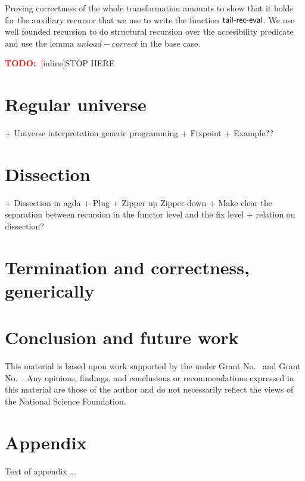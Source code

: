 \documentclass[sigplan,10pt,review]{acmart}
\newcommand\todo[1]{\textcolor{red}{\textbf{TODO:~}#1}}
\newcommand{\AF}{\AgdaFunction}
\newcommand{\Varid}[1]{\mathit{#1}}
\begin{document}
Proving correctness of the whole transformation amounts to show that
it holds for the auxiliary recursor that we use to write the function
\ensuremath{\AF{tail\text{-}rec\text{-}eval}}. We use well founded recursion to do structural
recursion over the accesibility predicate and use the lemma
\ensuremath{\Varid{unload-correct}} in the base case.

\todo[inline]{STOP HERE}

\section{Regular universe}
\label{sec:universe}
  + Universe interpretation generic programming
  + Fixpoint
  + Example??
\section{Dissection}
\label{sec:dissection}  
  + Dissection in agda
  + Plug
  + Zipper up Zipper down
  + Make clear the separation between recursion in the functor level and
  the fix level
  + relation on dissection?

\section{Termination and correctness, generically}
\label{sec:dissection}  

  
\section{Conclusion and future work}

\begin{acks}                            %
  This material is based upon work supported by the
   under Grant
  No.~ and Grant
  No.~.  Any opinions, findings, and
  conclusions or recommendations expressed in this material are those
  of the author and do not necessarily reflect the views of the
  National Science Foundation.
\end{acks}






\appendix
\section{Appendix}

Text of appendix \ldots
\end{document}

